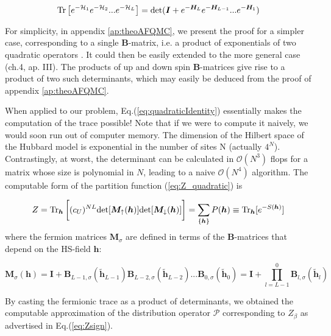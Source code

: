 \begin{equation}\label{eq:quadraticIdentity}
\operatorname{Tr} \big[ e^{-\mathcal{H}_1 } e^{-\mathcal{H}_2 } ... e^{-\mathcal{H}_L } \big] = \text{det} ( \bm I + e^{-\bm H_L} e^{-\bm H_{L-1}} ... e^{-\bm H_1} )
\end{equation}

For simplicity, in appendix \ref{ap:theoAFQMC}, we present the proof for a simpler case, corresponding to a single $\bm B$-matrix, i.e. a product of exponentials of two quadratic operators \cite{hirsch_two-dimensional_1985}.
It could then be easily extended to the more general case \cite{hanke_electronic_nodate}(ch.4, ap. III).
The products of up and down spin $\bm B$-matrices give rise to a product of two such determinants, which may easily be deduced from the proof of appendix \ref{ap:theoAFQMC}.

When applied to our problem, Eq.(\ref{eq:quadraticIdentity}) essentially makes the computation of the trace possible! Note that if we were to compute it naively, we would soon run out of computer memory.
The dimension of the Hilbert space of the Hubbard model is exponential in the number of sites N (actually $4^N$).
Contrastingly, at worst, the determinant can be calculated in $\mathcal{O}(N^3)$ flops for a matrix whose size is polynomial in $N$, leading to a naive $\mathcal{O}(N^4)$ algorithm.
The computable form of the partition function (\ref{eq:Z_quadratic}) is

\begin{equation}\label{eq:effectiveDensityMatrix}
Z =  \operatorname{Tr}_{\bm h} \bigg[ (c_U)^{NL} \text{det} [ \bm M_\uparrow (\bm h)] \text{det} [  \bm M_\downarrow (\bm h) ] \bigg] = \sum_{\{ \bm h \} } P ( \bm h ) \equiv \operatorname{Tr}_{\bm h} [ e^{-S(\bm h) } ]
\end{equation}
where the fermion matrices $\bm M_\sigma$ are defined in terms of the $\bm B$-matrices that depend on the HS-field $\bm h$:

\begin{equation}
\bm M_\sigma (\bm h) = \bm I + \bm B_{L-1,\sigma} ( \widetilde{\bm h}_{L-1}) \bm B_{L-2,\sigma} ( \widetilde{\bm h}_{L-2}) ... \bm B_{0,\sigma} ( \widetilde{\bm h}_0) = \bm I + \prod_{l= L -1}^0 \bm B_{l,\sigma} ( \widetilde{\bm h}_l )
\end{equation}

By casting the fermionic trace as a product of determinants, we obtained the computable approximation of the distribution operator $\mathcal{P}$ corresponding to $Z_{\beta}$ as advertised in Eq.(\ref{eq:Zsign}).

